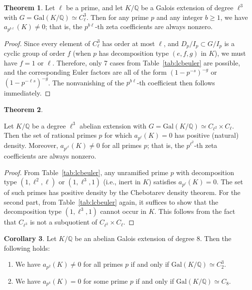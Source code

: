 \documentclass[letterpaper, 10pt]{article}
\newcommand{\Gal}{\mathrm{Gal}}
\newcommand{\bQ}{\mathbb{Q}}
\newcommand{\1}{\mathds{1}}	%
\theoremstyle{definition}
\newtheorem{theorem}{Theorem}[section]
\newtheorem{corollary}[theorem]{Corollary}
\theoremstyle{remark}
\begin{document}
\begin{theorem}
    \label{thm:Clcube_zeta_nonzero}
    Let \( \ell \) be a prime, and let \( K/\bQ \) be a Galois extension of degree \( \ell^3 \) with \( G = \Gal(K/\bQ) \simeq C_\ell^3 \). Then for any prime \( p \) and any integer \( b \ge 1 \), we have \( a_{p^{b\ell}}(K) \neq 0 \); that is, the \( p^{b\ell}\)-th zeta coefficients are always nonzero.
\end{theorem}
\begin{proof}
    Since every element of \( C_\ell^3 \) has order at most \( \ell \), and \( D_p / I_p \subset G / I_p \) is a cyclic group of order \( f \) (when \( p \) has decomposition type \( (e, f, g) \) in \( K \)), we must have \( f = 1 \) or \( \ell \). Therefore, only 7 cases from Table~\ref{tab:lcbeuler} are possible, and the corresponding Euler factors are all of the form \( (1 - p^{-s})^{-g} \) or \( (1 - p^{-\ell s})^{-g} \). The nonvanishing of the \( p^{b\ell} \)-th coefficient then follows immediately.
\end{proof}

\begin{theorem}
    \label{thm:C4C2}

    Let \( K / \bQ \) be a degree \( \ell^3 \) abelian extension with \( G = \Gal(K / \bQ) \simeq C_{\ell^2} \times C_\ell \). Then the set of rational primes \( p \) for which \( a_{p^\ell}(K) = 0 \) has positive (natural) density. Moreover, \( a_{p^{\ell^2}}(K) \ne 0 \) for all primes \( p \); that is, the \(p^{\ell^2}\)-th zeta coefficients are always nonzero.


\end{theorem}
\begin{proof}
    From Table~\ref{tab:lcbeuler}, any unramified prime \( p \) with decomposition type \( (1, \ell^2, \ell) \) or \( (1, \ell^3, 1) \) (i.e., inert in \( K \)) satisfies \( a_{p^\ell}(K) = 0 \). The set of such primes has positive density by the Chebotarev density theorem. For the second part, from Table~\ref{tab:lcbeuler} again, it suffices to show that the decomposition type \( (1, \ell^3, 1) \) cannot occur in \( K \). This follows from the fact that \( C_{\ell^3} \) is not a subquotient of \( C_{\ell^2} \times C_\ell \). 
\end{proof}

\begin{corollary}
    \label{cor:octic_zeta_ab}
    Let $K / \bQ$ be an abelian Galois extension of degree $8$.
    Then the following holds:
    \begin{enumerate}
        \item We have $a_{p^2}(K) \ne 0$ for all primes $p$ if and only if $\Gal(K / \bQ) \simeq C_2^3$.
        \item We have $a_{p^4}(K) = 0$ for some prime $p$ if and only if $\Gal(K / \bQ) \simeq C_8$.
    \end{enumerate}
\end{corollary}
\end{document}
